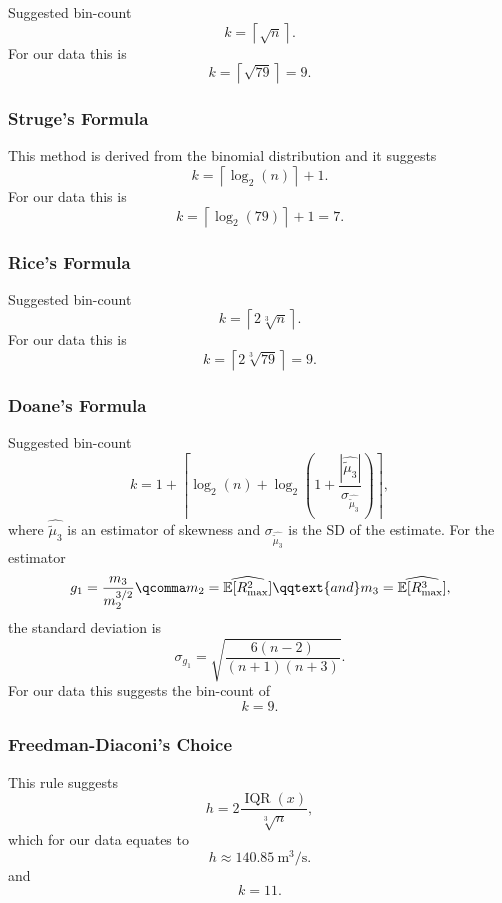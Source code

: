 Suggested bin-count \[
    k = \left\lceil \sqrt{n} \right\rceil.
\]
For our data this is \[
    k = \left\lceil \sqrt{79} \right\rceil = 9.
\] 

\subsubsection{Struge's Formula}%
\label{ssub:struge's_formula}

This method is derived from the binomial distribution and it suggests \[
    k = \left\lceil \log_2(n) \right\rceil + 1.
\]
For our data this is \[
    k = \left\lceil \log_2(79) \right\rceil + 1 = 7.
\] 

\subsubsection{Rice's Formula}%
\label{ssub:rice_formula}

Suggested bin-count \[
    k = \left\lceil 2 \sqrt[3]{n} \right\rceil.
\] 
For our data this is  \[
    k = \left\lceil 2 \sqrt[3]{79} \right\rceil = 9.
\] 


\subsubsection{Doane's Formula}%
\label{ssub:doane's_formula}

Suggested bin-count \[
    k = 1 + \left\lceil \log_2(n) + 
    \log_2 \left( 1 + \frac{\left| \widehat{\tilde{\mu}_3} \right|}{\sigma_{\widehat{\tilde{\mu}_3}}} \right)
\right\rceil,
\] where \(\widehat{\tilde{\mu}_3}\) is an estimator of skewness and \(\sigma_{\widehat{\tilde{\mu}_3}}\) is the
\ac{SD} of the estimate. For the estimator \[
    g_1 = \frac{m_3}{m_2^{3/2}}\qcomma m_2 = \widehat{\mathbb{E}[R_{\max}^2]} \qqtext{and} m_3
    = \widehat{\mathbb{E}[R_{\max}^3]},
\] the standard deviation is \[
    \sigma_{g_1} = \sqrt{\frac{6(n-2)}{(n+1)(n+3)}}.
\] 
For our data this suggests the bin-count of \[
    k = 9.
\]

\subsubsection{Freedman-Diaconi's Choice}%
\label{ssub:freedman-diaconi's_choice}

This rule suggests \[
    h = 2 \frac{\mathop{IQR}(x)}{\sqrt[3]{n}},
\] which for our data equates to \[
h \approx \qty{140.85}{\metre\cubed\per\second}.
\] and \[
    k = 11.
\] 

\begin{table}[t]
  
  \caption{Summary of methods for histogram parameter selection}
  \label{tab:hist_choices}
\end{table}

